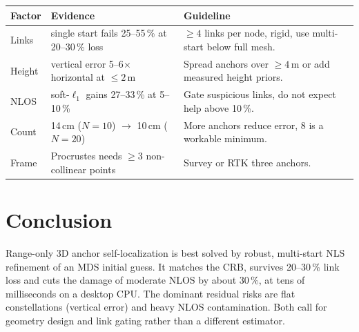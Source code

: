 \documentclass[10pt,a4paper,twocolumn]{extarticle}
\begin{document}
\par\vspace{3pt}\noindent\begin{minipage}{\columnwidth}
\centering
{}
\label{tab:rules}
\footnotesize
\setlength{\tabcolsep}{3pt}
\begin{tabular}{@{}P{1.35cm}P{3.0cm}P{3.9cm}@{}}
\toprule
Factor & Evidence & Guideline\\
\midrule
Links & single start fails 25--55\,\% at 20--30\,\% loss & $\ge4$ links per node, rigid, use multi-start below full mesh.\\
Height & vertical error 5--6$\times$ horizontal at $\le2$\,m & Spread anchors over $\ge4$\,m or add measured height priors.\\
NLOS & soft-$\ell_1$ gains 27--33\,\% at 5--10\,\% & Gate suspicious links, do not expect help above 10\,\%.\\
Count & 14\,cm ($N{=}10$) $\to$ 10\,cm ($N{=}20$) & More anchors reduce error, 8 is a workable minimum.\\
Frame & Procrustes needs $\ge3$ non-collinear points & Survey or RTK three anchors.\\
\bottomrule
\end{tabular}
\end{minipage}\par\vspace{3pt}
\section{Conclusion}
Range-only 3D anchor self-localization is best solved by robust, multi-start NLS refinement of an MDS initial guess. It matches the CRB,
survives 20--30\,\% link loss and cuts the damage of moderate NLOS by about 30\,\%, at tens of milliseconds on a desktop CPU. The dominant residual risks
are flat constellations (vertical error) and heavy NLOS contamination. Both call for geometry design and link gating rather than a different estimator.


{\footnotesize\setlength{\itemsep}{0pt}
\begin{thebibliography}{99}
\setlength{\itemsep}{0pt}\setlength{\parsep}{0pt}

\end{thebibliography}}
\end{document}
